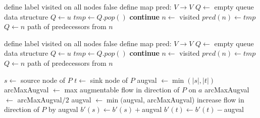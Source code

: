\begin{algorithm}
 \begin{algorithmic}
    \State define label visited on all nodes false
    \State define map pred: $V\to V$
    \State $Q\gets $ empty queue data structure
    \State $Q\gets u$
      \State $tmp\gets Q.pop()$
	  \State \textbf{continue}
	  \State $n\gets$ visited
	  \State $pred(n)\gets tmp$
	  \State $Q\gets n$
	    \State\Return path of predecessors from $n$
	  \EndIf
	\EndIf
      \EndFor
    \EndWhile
  
  \EndFunction
 \end{algorithmic}
 
\end{algorithm}
\begin{algorithm}
 \begin{algorithmic}
    \State define label visited on all nodes false
    \State define map pred: $V\to V$
    \State $Q\gets $ empty queue data structure
    \State $Q\gets u$
      \State $tmp\gets Q.pop()$
	  \State \textbf{continue}
	  \State $n\gets$ visited
	  \State $pred(n)\gets tmp$
	  \State $Q\gets n$
	    \State\Return path of predecessors from $n$
	  \EndIf
	\EndIf
      \EndFor
    \EndWhile
  
  \EndFunction
 \end{algorithmic}
\end{algorithm}
\begin{algorithm}
 \begin{algorithmic}
    \State $s\gets $ source node of $P$
    \State $t\gets $ sink node of $P$
    \State augval $\gets \min(|s|,|t|)$
      \State arcMaxAugval $\gets$ max augmentable flow in direction of $P$ on $a$ 
	\State arcMaxAugval$\gets$ arcMaxAugval$/2$
      \EndIf
      \State augval $\gets \min($augval, arcMaxAugval)
    \EndFor
      \State increase flow in direction of $P$ by augval
    \EndFor
    \State $b'(s)\gets b'(s)+$augval
    \State $b'(t)\gets b'(t)-$augval
  \EndFunction
 \end{algorithmic}
 
\end{algorithm}


